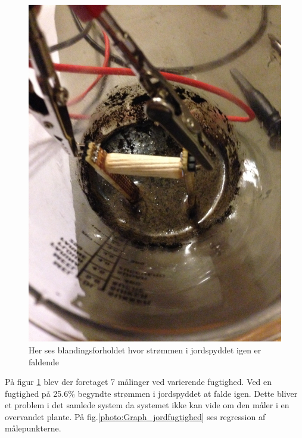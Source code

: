 \begin{figure}[H]
	\centering 
	\includegraphics[scale=0.08]{HardwareArkitektur/Sensore/Jordfugt_billeder/Maetningspunktet.JPG}
	\caption{Her ses blandingsforholdet hvor strømmen i jordspyddet igen er faldende}
	\label{photo:Maetningspunkt}
\end{figure}  

På figur \ref{photo:Maetningspunkt} blev der foretaget 7 målinger ved varierende fugtighed. Ved en fugtighed på 25.6\% begyndte strømmen i jordspyddet at falde igen. Dette bliver et problem i det samlede system da systemet ikke kan vide om den måler i en overvandet plante. På fig.\ref{photo:Graph_jordfugtighed} ses regression af målepunkterne. 

